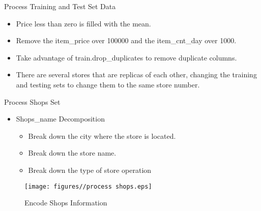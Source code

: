 \documentclass[
size=14pt,
paper=smartboard,  %
mode=present, 		%
display=slides, 	%
style=tuliplab,  	%
pauseslide,
fleqn,leqno]{powerdot}
\begin{document}
	
	\begin{slide}{Process Training and Test Set Data}
		\begin{itemize}
			\item
			Price less than zero is filled with the mean.
			\item
			Remove the item\_price over 100000 and the item\_cnt\_day over 1000.
			\item
			Take advantage of train.drop\_duplicates to remove duplicate columns.
			\item
			There are several stores that are replicas of each other, changing the training and testing sets to change them to the same store number.
		\end{itemize}
		
	\end{slide}
	
	
	\begin{slide}{Process Shops Set}
		\begin{itemize}
			\item
			Shops\_name Decomposition
			\begin{itemize}
				\item
				\smallskip
				Break down the city where the store is located.
				\item
				\smallskip
				Break down the store name.
				\item
				\smallskip
				Break down the type of store operation
			\end{itemize}
		\end{itemize}
		\begin{figure}
			\centering
			\texttt{[image: figures//process shops.eps]}
			\caption{Encode Shops Information}\label{fig:timg}
		\end{figure}
		
	\end{slide}
	
	
	
\end{document}
